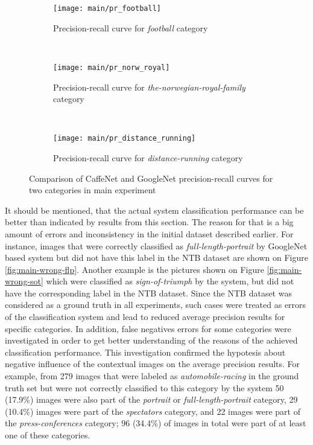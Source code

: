     \begin{figure}[h!]
        \centering
        \begin{subfigure}[a]{0.8\textwidth}
            \texttt{[image: main/pr\_football]}
            \caption{Precision-recall curve for \textit{football} category}
            \label{fig:main-pr-football}
        \end{subfigure}
        \\
        \begin{subfigure}[a]{0.8\textwidth}
            \texttt{[image: main/pr\_norw\_royal]}
            \caption{Precision-recall curve for \textit{the-norwegian-royal-family} category}
            \label{fig:main-pr-royal}
        \end{subfigure}
        \\
        \begin{subfigure}[a]{0.8\textwidth}
            \texttt{[image: main/pr\_distance\_running]}
            \caption{Precision-recall curve for \textit{distance-running} category}
            \label{fig:main-pr-distance-running}
        \end{subfigure}
        \caption{Comparison of CaffeNet and GoogleNet precision-recall curves for two categories in main experiment}
        \label{main-pr}
    \end{figure}
    
    It should be mentioned, that the actual system classification performance can be better than indicated by results from this section. The reason for that is a big amount of errors and inconsistency in the initial dataset described earlier. For instance, images that were correctly classified as \textit{full-length-portrait} by GoogleNet based system but did not have this label in the NTB dataset are shown on Figure \ref{fig:main-wrong-flp}. Another example is the pictures shown on Figure \ref{fig:main-wrong-sot} which were classified as \textit{sign-of-triumph} by the system, but did not have the corresponding label in the NTB dataset. Since the NTB dataset was considered as a ground truth in all experiments, such cases were treated as errors of the classification system and lead to reduced average precision results for specific categories. In addition, false negatives errors for some categories were investigated in order to get better understanding of the reasons of the achieved classification performance. This investigation confirmed the hypotesis about negative influence of the contextual images on the average precision results. For example, from 279 images that were labeled as \textit{automobile-racing} in the ground truth set but were not correctly classified to this category by the system 50 (17.9\%) images were also part of the \textit{portrait} or \textit{full-length-portrait} category, 29 (10.4\%) images were part of the \textit{spectators} category, and 22 images were part of the \textit{press-conferences} category; 96 (34.4\%) of images in total were part of at least one of these categories.
    

